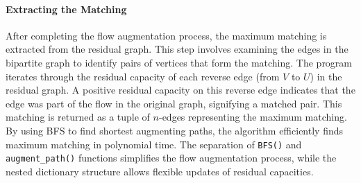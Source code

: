 \paragraph{Extracting the Matching}
After completing the flow augmentation process, the maximum matching is extracted from the residual graph. This step involves examining the edges in the bipartite graph to identify pairs of vertices that form the matching. The program iterates through the residual capacity of each reverse edge (from \( V \) to \( U \)) in the residual graph. A positive residual capacity on this reverse edge indicates that the edge was part of the flow in the original graph, signifying a matched pair. This matching is returned as a tuple of $n$-edges representing the maximum matching.\\

\noindent By using BFS to find shortest augmenting paths, the algorithm efficiently finds maximum matching in polynomial time. The separation of \texttt{BFS()} and \texttt{augment\_path()} functions simplifies the flow augmentation process, while the nested dictionary structure allows flexible updates of residual capacities.




